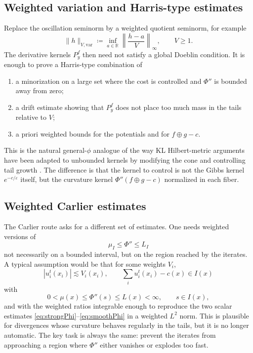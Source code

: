 \documentclass[11pt]{article}
\newcommand{\R}{\mathbb{R}}
\newcommand{\eps}{\varepsilon}
\newcommand{\defeq}{\coloneqq}
\begin{document}
\subsection{Weighted variation and Harris-type estimates}

Replace the oscillation seminorm by a weighted quotient seminorm, for example
\begin{equation}\label{eq:weightedosc}
  \|h\|_{V,\mathrm{var}}
  \defeq
  \inf_{a\in\R}
  \left\|\frac{h-a}{V}\right\|_\infty,
  \qquad V\geq 1.
\end{equation}
The derivative kernels $P_y^f$ then need not satisfy a global Doeblin
condition.  It is enough to prove a Harris-type combination of
\begin{enumerate}[label=(\roman*)]
  \item a minorization on a large set where the cost is controlled and
  $\Phi''$ is bounded away from zero;
  \item a drift estimate showing that $P_y^f$ does not place too much mass in
  the tails relative to $V$;
  \item a priori weighted bounds for the potentials and for
  $f\oplus g-c$.
\end{enumerate}
This is the natural general-$\phi$ analogue of the way KL Hilbert-metric
arguments have been adapted to unbounded kernels by modifying the cone and
controlling tail growth \cite{eckstein2025}.  The difference is that the kernel
to control is not the Gibbs kernel $e^{-c/\eps}$ itself, but the curvature
kernel $\Phi''(f\oplus g-c)$ normalized in each fiber.

\subsection{Weighted Carlier estimates}

The Carlier route asks for a different set of estimates.  One needs weighted
versions of
\begin{equation*}
  \mu_I\leq \Phi''\leq L_I
\end{equation*}
not necessarily on a bounded interval, but on the region reached by the
iterates.  A typical assumption would be that for some weights $V_i$,
\begin{equation*}
  |u_i^t(x_i)|\lesssim V_i(x_i),
  \qquad
  \sum_i u_i^t(x_i)-c(x)\in I(x)
\end{equation*}
with
\begin{equation*}
  0<\mu(x)\leq \Phi''(s)\leq L(x)<\infty,
  \qquad s\in I(x),
\end{equation*}
and with the weighted ratios integrable enough to reproduce the two scalar
estimates \eqref{eq:strongPhi}--\eqref{eq:smoothPhi} in a weighted $L^2$ norm.
This is plausible for divergences whose curvature behaves regularly in the
tails, but it is no longer automatic.  The key task is always the same:
prevent the iterates from approaching a region where $\Phi''$ either vanishes
or explodes too fast.
\end{document}
